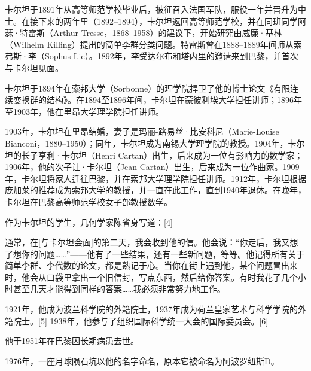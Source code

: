 卡尔坦于1891年从高等师范学校毕业后，被征召入法国军队，服役一年并晋升为中士。在接下来的两年里（1892–1894），卡尔坦返回高等师范学校，并在同班同学阿瑟·特雷斯（Arthur Tresse，1868–1958）的建议下，开始研究由威廉·基林（Wilhelm Killing）提出的简单李群分类问题。特雷斯曾在1888–1889年间师从索弗斯·李（Sophus Lie）。1892年，李受达尔布和塔内里的邀请来到巴黎，并首次与卡尔坦见面。

卡尔坦于1894年在索邦大学（Sorbonne）的理学院捍卫了他的博士论文《有限连续变换群的结构》。在1894至1896年间，卡尔坦在蒙彼利埃大学担任讲师；1896年至1903年，他在里昂大学理学院担任讲师。

1903年，卡尔坦在里昂结婚，妻子是玛丽-路易丝·比安科尼（Marie-Louise Bianconi，1880–1950）；同年，卡尔坦成为南锡大学理学院的教授。1904年，卡尔坦的长子亨利·卡尔坦（Henri Cartan）出生，后来成为一位有影响力的数学家；1906年，他的次子让·卡尔坦（Jean Cartan）出生，后来成为一位作曲家。1909年，卡尔坦将家人迁往巴黎，并在索邦大学理学院担任讲师。1912年，卡尔坦根据庞加莱的推荐成为索邦大学的教授，并一直在此工作，直到1940年退休。在晚年，卡尔坦在巴黎高等师范学校女子部教授数学。

作为卡尔坦的学生，几何学家陈省身写道：[4]

通常，在[与卡尔坦会面]的第二天，我会收到他的信。他会说：“你走后，我又想了想你的问题……”——他有了一些结果，还有一些新问题，等等。他记得所有关于简单李群、李代数的论文，都是熟记于心。当你在街上遇到他，某个问题冒出来时，他会从口袋里拿出一个旧信封，写点东西，然后给你答案。有时我花了几个小时甚至几天才能得到同样的答案……我必须非常努力地工作。

1921年，他成为波兰科学院的外籍院士，1937年成为荷兰皇家艺术与科学学院的外籍院士。[5] 1938年，他参与了组织国际科学统一大会的国际委员会。[6]

他于1951年在巴黎因长期病患去世。

1976年，一座月球陨石坑以他的名字命名，原本它被命名为阿波罗纽斯D。

